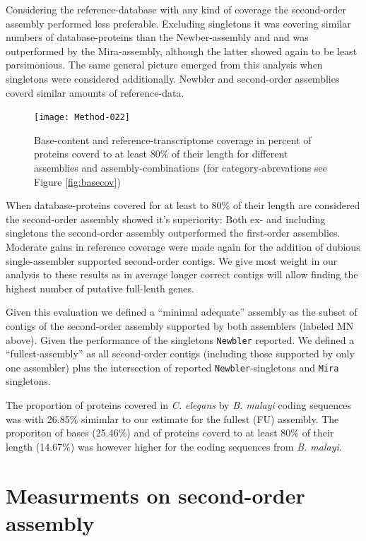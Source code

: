 \documentclass[12pt,a4paper]{article}
\begin{document}
Considering the reference-database with any kind of coverage the
second-order assembly performed less preferable. Excluding singletons
it was covering similar numbers of database-proteins than the
Newber-assembly and and was outperformed by the Mira-assembly,
although the latter showed again to be least parsimonious. The same
general picture emerged from this analysis when singletons were
considered additionally. Newbler and second-order assemblies coverd
similar amounts of reference-data.

\begin{figure}[H]

\texttt{[image: Method-022]}
\caption{Base-content and reference-transcriptome coverage in percent
  of proteins coverd to at least 80\% of their length for different
  assemblies and assembly-combinations (for category-abrevations see
  Figure \ref{fig:basecov})}
\label{fig:prot80cov}
\end{figure}

When database-proteins covered for at least to 80\% of their length
are considered the second-order assembly showed it's superiority: Both
ex- and including singletons the second-order assembly outperformed
the first-order assemblies. Moderate gains in reference coverage were
made again for the addition of dubious single-assembler supported
second-order contigs. We give most weight in our analysis to these
results as in average longer correct contigs will allow finding the
highest number of putative full-lenth genes.

Given this evaluation we defined a ``minimal adequate'' assembly as the
subset of contigs of the second-order assembly supported by both
assemblers (labeled MN above). Given the performance of the singletons
\texttt{Newbler} reported. We defined a ``fullest-assembly'' as all
second-order contigs (including those supported by only one assembler)
plus the intersection of reported \texttt{Newbler}-singletons and
\texttt{Mira} singletons.

The proportion of proteins covered in \textit{C. elegans} by
\textit{B. malayi} coding sequences was with
26.85\% simimlar to our estimate for
the fullest (FU) assembly. The proporiton of bases
(25.46\%) and of proteins coverd to at
least 80\% of their length (14.67\%)
was however higher for the coding sequences from \textit{B. malayi}.

\section{Measurments on second-order assembly}
\end{document}
